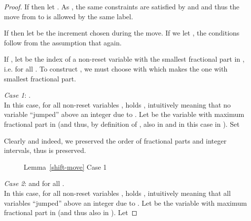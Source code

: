 \documentclass[fleqn,envcountsame]{LMCS}
\begin{document}
\begin{proof}
If  then let .
As , the same constraints are satisfied by  and  and thus
the move from  to  is allowed by the same label.

If  then let  be the increment
chosen during the move. If  we let , the conditions
follow from the assumption that  again.

If , let  be the index of a non-reset variable
with the smallest fractional part in , i.e.
 for all .
To construct , we must choose  with  which makes
 the one with smallest fractional part. 

\emph{Case 1}: .\\
  In this case, for all non-reset variables , holds
  , intuitively meaning
  that no variable ``jumped'' above an integer due to .
  Let  be the variable with maximum fractional part in 
  (and thus, by definition of , also in  and in this case in ). Set 
  
  Clearly  and indeed, we preserved the order of
  fractional parts and integer intervals, thus  is preserved.

\begin{figure}[h]
\begin{center}
\end{center}
\caption{Lemma~\ref{shift-move} Case 1}
\label{fig-case-1}
\end{figure}

\emph{Case 2}:  and for all 
.\\
  In this case, for all non-reset variables , holds
  , intuitively meaning
  that all variables ``jumped'' above an integer due to .
  Let  be the variable with maximum fractional part in 
  (and thus also in ). Let
  

\end{proof}
\end{document}
